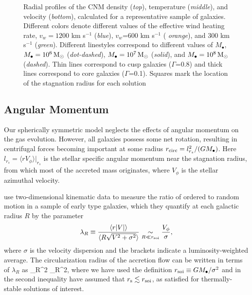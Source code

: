 \documentclass[usenatbib,fleqn]{mn2e}
\newcommand{\Mbh}[1][]{M_{\bullet#1}}
\newcommand{\vwO}{v_{w}}
\begin{document}
\begin{figure}
  \caption{\label{fig:profiles}Radial profiles of the CNM density
    ({\it top}), temperature ({\it middle}), and velocity ({\it bottom}),
    calculated for a representative sample of galaxies.  Different colors
    denote different values of the effective wind heating rate,
    $\vwO=1200$ km s$^{-1}$ ({\it blue}), $\vwO$=600 km s$^{-1}$ ({\it
      orange}), and 300 km s$^{-1}$ ({\it green}).  Different
    linestyles correspond to different values of $\Mbh$, $\Mbh=10^6
    \Msun$ ({\it dot-dashed}), $\Mbh=10^7 \Msun$ ({\it solid}), and
    $\Mbh=10^8 \Msun$ ({\it dashed}). Thin lines correspond to cusp
    galaxies ($\Gamma$=0.8) and thick lines correspond to core
    galaxies ($\Gamma$=0.1). Squares mark the location of
    the stagnation radius for each solution
 }
\end{figure}

  \subsection{Angular Momentum}
  \label{sec:rotation}

Our spherically symmetric model neglects the effects of angular momentum on the gas evolution.  However, all galaxies possess some net rotation, resulting in centrifugal forces becoming important at some radius $r_{\rm circ} = l^{2}_{r_{s}}/(GM_{\bullet})$.  Here $l_{r_{s}} = \langle r V_{\phi}\rangle |_{r_s}$ is the stellar specific angular momentum near the stagnation radius, from which most of the accreted mass originates, where $V_{\phi}$ is the stellar azimuthal velocity.    

\citet{EmsellemCappellari+:2007a} use two-dimensional kinematic data to measure the ratio of ordered to random motion in a sample of early type galaxies, which they quantify at each galactic radius $R$ by the parameter
  \begin{align}
    \lambda_R \equiv \frac{\langle r|V|\rangle}{\langle R\sqrt{V^2+\sigma^2}\rangle} \underset{R \ll r_{\rm soi}}\sim \frac{V_{\phi}}{\sigma},
  \end{align}
where $\sigma$ is the velocity dispersion and the brackets indicate a luminosity-weighted average.  The circularization radius of the accretion flow can be written in terms of $\lambda_R$ as
\be
{} \approx {}\lambda_{R}^{2} \lesssim \lambda_{R}^{2},
\label{eq:rcirc}
\ee
where we have used the definition $r_{\rm soi} \equiv GM_{\bullet}/\sigma^{2}$ and in the second inequality have assumed that $r_{\rm s} \lesssim r_{\rm soi}$, as satisfied for thermally-stable solutions of interest.
\end{document}
